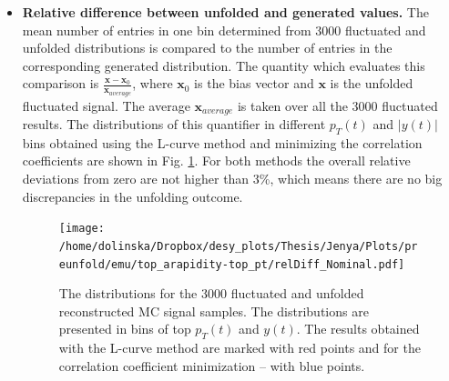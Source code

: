 \begin{itemize}
 \item \textbf{Relative difference between unfolded and generated values.} The mean number of entries in one bin determined from 3000 fluctuated and unfolded distributions
 is  compared to the number of entries in the corresponding generated distribution. The quantity which evaluates this comparison is
 $\frac{\mathbf{x} - \mathbf{x}_{0}}{\mathbf{x}_{average}}$, where $\mathbf{x}_{0}$ is the bias vector and $\mathbf{x}$ is the unfolded fluctuated signal. 
 The average $\mathbf{x}_{average}$ is taken over all the 3000 fluctuated results.
 The distributions of this quantifier in different $p_{T}(t)$ and $|y(t)|$ bins obtained using the L-curve method and minimizing the correlation coefficients 
 are shown in Fig. \ref{fig:DiffovErr}. For both methods the overall relative deviations from zero are not
 higher than 3\%, which means there are no big discrepancies in the unfolding outcome.
 \begin{figure}[t]
 \centering
 \texttt{[image: /home/dolinska/Dropbox/desy\_plots/Thesis/Jenya/Plots/preunfold/emu/top\_arapidity-top\_pt/relDiff\_Nominal.pdf]}
 \caption{The distributions for the 3000 fluctuated and unfolded reconstructed MC signal samples. The distributions are
         presented in bins of top $p_{T}(t)$ and $y(t)$. The results obtained with the L-curve method are marked with red points and 
         for the correlation coefficient minimization -- with blue points.}
 \label{fig:DiffovErr}
\end{figure}
 

\end{itemize}
